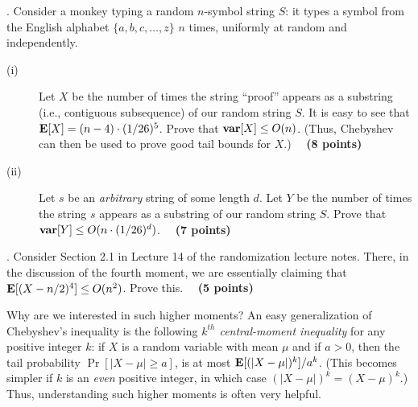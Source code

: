 \documentclass{article}[11pt]
\begin{document}
\medskip {}. 
Consider a monkey typing a random $n$-symbol string $S$: it types a symbol from the English alphabet $\{a, b, c, \ldots, z \}$ $n$ times, uniformly at random and independently. 
\begin{description}
\item[(i)] Let $X$ be the number of times the string ``proof'' appears as a substring (i.e., contiguous subsequence) of our random string $S$. It is easy to see that $\textbf{E}[X] = (n-4) \cdot (1/26)^5$. Prove that $\textbf{var}[X] \leq O(n)$. (Thus, Chebyshev can then be used to prove good tail bounds for $X$.)
~~\textbf{(8 points)} 
\item[(ii)] Let $s$ be an \emph{arbitrary} string of some length $d$. Let $Y$ be the number of times the string $s$ appears as a substring of our random string $S$. Prove that $\textbf{var}[Y] \leq O(n \cdot (1/26)^d)$.
~~\textbf{(7 points)} 
\end{description}

\medskip {}. 
Consider Section 2.1 in Lecture 14 of the randomization lecture notes. There, in the discussion of the fourth moment, we are essentially claiming that $\textbf{E}[(X - n/2)^4] \leq O(n^2)$. Prove this. ~~\textbf{(5 points)} 

Why are we interested in such higher moments? An easy generalization of Chebyshev's inequality is the following \emph{$k^{th}$ central-moment inequality} for any positive integer $k$: if $X$ is a random variable with mean $\mu$ and if $a > 0$, then the tail probability $\Pr[|X - \mu| \geq a]$, is at most $\textbf{E}[(|X - \mu|)^k] / a^k$. (This becomes simpler if $k$ is an \emph{even} positive integer, in which case $(|X - \mu|)^k = (X - \mu)^k$.) Thus, understanding such higher moments is often very helpful. 
\end{document}

